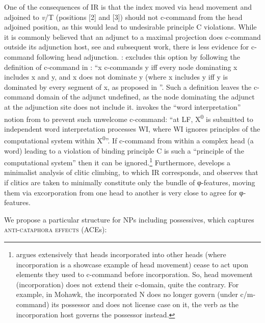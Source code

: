 \documentclass[output=paper,modfonts,nonflat
]{langsci/langscibook}
\begin{document}
One of the consequences of IR is that the index moved via head movement and adjoined to \textit{v}/T (positions [2] and [3]) should not c-command from the head adjoined position, as this would lead to undesirable principle C violations. While it is commonly believed that an adjunct to a maximal projection does c-command outside its adjunction host, see \cite{kayne1994} and subsequent work, there is less evidence for c-command following head adjunction. \cite[93--94]{nikolaeva2014}: excludes this option by following the definition of c-command in \cite[574]{hestvik1992}: ``x c-commands y iff every node dominating x includes x and y, and x does not dominate y (where x includes y iff y is dominated by every segment of x, as proposed in \cite{may1985}''. Such a definition leaves the c-command domain of the adjunct undefined, as the node dominating the adjunct at the adjunction site does not include it. \cite{citkoetal2018} invokes the ``word interpretation'' notion from \cite[322]{chomsky1995} to prevent such unwelcome c-command: ``at LF, X\textsuperscript{0} is submitted to independent word interpretation processes WI, where WI ignores principles of the computational system within  X\textsuperscript{0}''. If c-command from within a complex head (a word) leading to a violation of binding principle C is such a ``principle of the computational system'' then it can be ignored.\footnote{\label{fn15}\cite{baker1988} argues extensively that heads incorporated into other heads (where incorporation is a showcase example of head movement) cease to act upon elements they used to c-command before incorporation. So, head movement (incorporation) does not extend their c-domain, quite the contrary. For example, in Mohawk, the incorporated N does no longer govern (under c/m-command) its possessor and does not license case on it, the verb as the incorporation host governs the possessor instead.}
Furthermore, \cite{roberts2009} develops a minimalist analysis of clitic climbing, to which IR corresponds, and observes that if clitics are taken to minimally constitute only the bundle of φ-features, moving them via excorporation from one head to another is very close to agree for φ-features. 

We propose a particular structure for NPs including possessives, which captures \textsc{anti-}\textsc{cataphora} \textsc{effects} (ACEs):

\z
                
\end{document}
